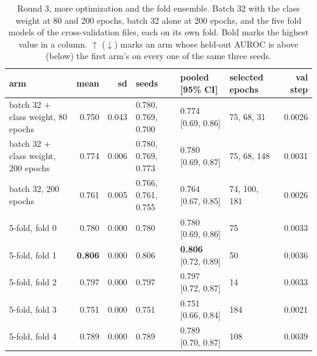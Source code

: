 \begin{table}[H]
  \centering
  \footnotesize
  \caption[Round 3, more optimization and the fold ensemble]{Round 3, more optimization and the fold ensemble. Batch 32 with the class weight at 80 and 200 epochs, batch 32 alone at 200 epochs, and the five fold models of the cross-validation files, each on its own fold. Bold marks the highest value in a column. $\uparrow$ ($\downarrow$) marks an arm whose held-out AUROC is above (below) the first arm's on every one of the same three seeds.}
  \label{tab:w14}
  \begin{tabular}{@{}lrrlllr@{}}
    \hline
    arm & mean & sd & seeds & pooled [95\% CI] & selected epochs & val step \\
    \hline
    batch 32 $+$ class weight, 80 epochs & 0.750 & 0.043 & 0.780, 0.769, 0.700 & 0.774 [0.69, 0.86] & 75, 68, 31 & 0.0026 \\
    batch 32 $+$ class weight, 200 epochs & 0.774 & 0.006 & 0.780, 0.769, 0.773 & 0.780 [0.69, 0.87] & 75, 68, 148 & 0.0031 \\
    batch 32, 200 epochs & 0.761 & 0.005 & 0.766, 0.761, 0.755 & 0.764 [0.67, 0.85] & 74, 100, 181 & 0.0026 \\
    5-fold, fold 0 & 0.780 & 0.000 & 0.780 & 0.780 [0.69, 0.86] & 75 & 0.0033 \\
    5-fold, fold 1 & \textbf{0.806} & 0.000 & 0.806 & \textbf{0.806} [0.72, 0.89] & 50 & 0.0036 \\
    5-fold, fold 2 & 0.797 & 0.000 & 0.797 & 0.797 [0.72, 0.87] & 14 & 0.0033 \\
    5-fold, fold 3 & 0.751 & 0.000 & 0.751 & 0.751 [0.66, 0.84] & 184 & 0.0021 \\
    5-fold, fold 4 & 0.789 & 0.000 & 0.789 & 0.789 [0.70, 0.87] & 108 & 0.0039 \\
    \hline
  \end{tabular}
\end{table}
